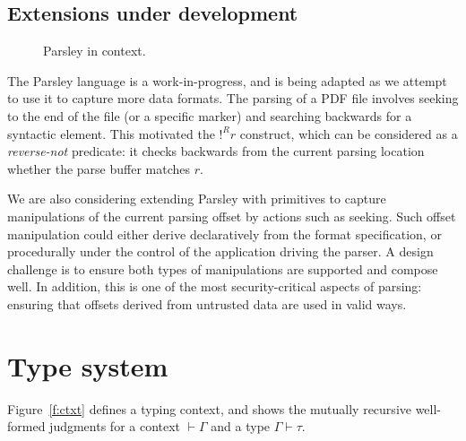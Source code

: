 \documentclass[letterpaper]{article}
\begin{document}
\subsection*{Extensions under development}

\begin{figure*}[!ht]
  \centering
  \resizebox{10cm}{!}{}
  \label{f:pipeline}
  \caption{Parsley in context.}
\end{figure*}

The Parsley language is a work-in-progress, and is being adapted as we
attempt to use it to capture more data formats.  The parsing of a PDF
file involves seeking to the end of the file (or a specific marker)
and searching backwards for a syntactic element.  This motivated the
$!^Rr$ construct, which can be considered as a \emph{reverse-not}
predicate: it checks backwards from the current parsing location
whether the parse buffer matches $r$.

We are also considering extending Parsley with primitives to capture
manipulations of the current parsing offset by actions such as
seeking.  Such offset manipulation could either derive declaratively
from the format specification, or procedurally under the control of
the application driving the parser.  A design challenge is to ensure
both types of manipulations are supported and compose well.  In
addition, this is one of the most security-critical aspects of
parsing: ensuring that offsets derived from untrusted data are used in
valid ways.

\section{Type system}

Figure~\ref{f:ctxt} defines a typing context, and shows the mutually
recursive well-formed judgments for a context $\vdash\Gamma$ and a
type $\Gamma\vdash\tau$.
\end{document}
